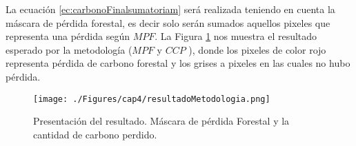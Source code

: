 
La ecuaci\'on  \ref{ec:carbonoFinalsumatoriam} ser\'a realizada teniendo en cuenta la m\'ascara de p\'erdida forestal, es decir solo ser\'an sumados aquellos pixeles que representa una p\'erdida seg\'un $ MPF $. La Figura \ref{fig:resulPC} nos muestra el resultado esperado por la metodolog\'ia ($ MPF $ y $ CCP $ ), donde los pixeles de color rojo representa p\'erdida de carbono forestal y los grises a pixeles en las cuales no hubo p\'erdida.
\begin{figure}[H]
	\centering
	\texttt{[image: ./Figures/cap4/resultadoMetodologia.png]}
	\caption{Presentaci\'on del resultado. M\'ascara de p\'erdida Forestal y la cantidad de carbono perdido.}
	\label{fig:resulPC}
\end{figure}
